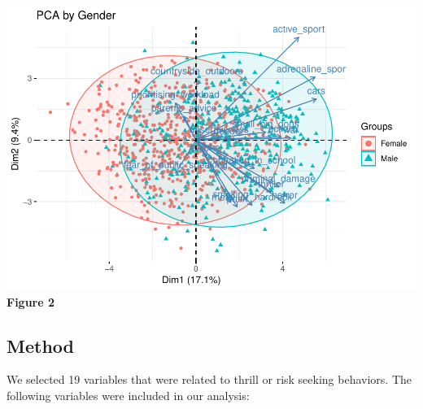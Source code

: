 \documentclass[]{article}
\begin{document}
\includegraphics{final_report_files/figure-latex/unnamed-chunk-2-1.pdf}
\textbf{Figure 2}

\subsection{Method}\label{method}

We selected 19 variables that were related to thrill or risk seeking
behaviors. The following variables were included in our analysis:
\end{document}
